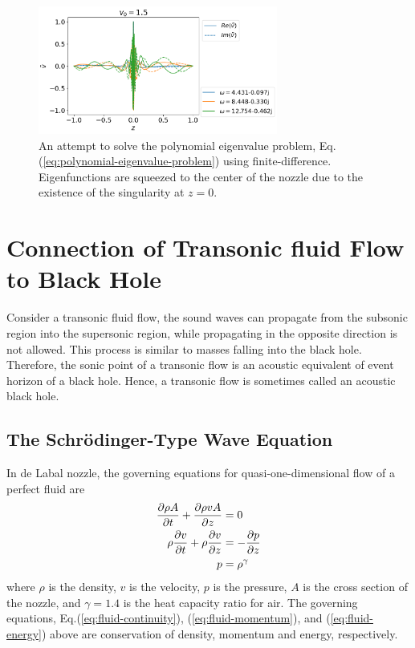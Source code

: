\begin{figure} [htbp]
	\centering
	\includegraphics[width=0.7\textwidth]{figures/results-bad-accelerating-v}
	\caption{An attempt to solve the polynomial eigenvalue problem, Eq.(\ref{eq:polynomial-eigenvalue-problem}) using finite-difference. Eigenfunctions are squeezed to the center of the nozzle due to the existence of the singularity at $z=0$.}
	\label{fig:failure-of-spectral-method}
\end{figure}

\section{Connection of Transonic fluid Flow to Black Hole}
Consider a transonic fluid flow, the sound waves can propagate from the subsonic region into the supersonic region, while propagating in the opposite direction is not allowed. This process is similar to masses falling into the black hole. Therefore, the sonic point of a transonic flow is an acoustic equivalent of event horizon of a black hole. Hence, a transonic flow is sometimes called an acoustic black hole. \cite{okuzumi_sakagami_quasinormal_2007}

\subsection{The Schr{\"o}dinger-Type Wave Equation}
In de Labal nozzle, the governing equations for quasi-one-dimensional flow of a perfect fluid are
\begin{align}
	\pdv{\rho A}{t}	+ \pdv{\rho vA}{z} & = 0            \label{eq:fluid-continuity} \\
	\rho\pdv{v}{t}	+ \rho\pdv{v}{z}    & = -\pdv{p}{z}  \label{eq:fluid-momentum}   \\
	p                                  & = \rho^\gamma \label{eq:fluid-energy}
\end{align}
where $\rho$ is the density, $v$ is the velocity, $p$ is the pressure, $A$ is the cross section of the nozzle, and $\gamma=1.4$ is the heat capacity ratio for air. The governing equations, Eq.(\ref{eq:fluid-continuity}), (\ref{eq:fluid-momentum}), and (\ref{eq:fluid-energy}) above are conservation of density, momentum and energy, respectively.

